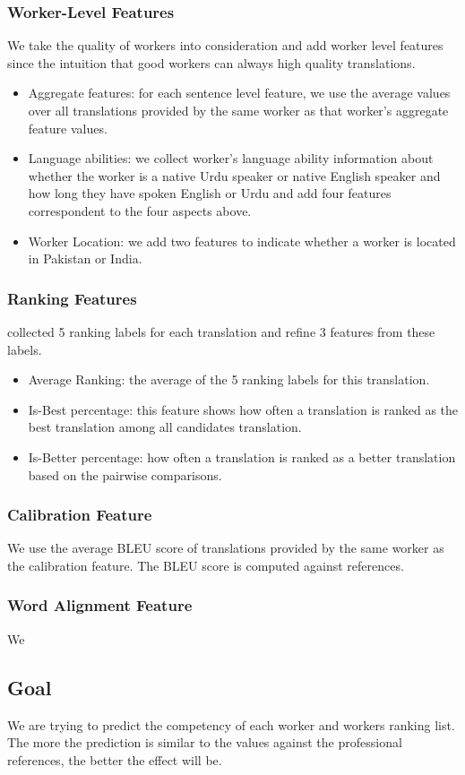 \documentclass[11pt]{article}
\begin{document}
 \subsubsection{Worker-Level Features}
 We take the quality of workers into consideration and add worker level features since the intuition that good workers can always high quality translations.
\begin{itemize}
\item	Aggregate features:	for each sentence level feature, we use the average values over all translations provided by the same worker as that worker's aggregate feature values.
\item	Language abilities:	we collect worker's language ability information about whether the worker is a native Urdu speaker or native English speaker and how long they have spoken English or Urdu and add four features correspondent to the four aspects above.
\item	Worker Location:	we add two features to indicate whether a worker is located in Pakistan or India.
\end{itemize}
 \subsubsection{Ranking Features}
  collected 5 ranking labels for each translation and refine 3 features from these labels.
 \begin{itemize}
 \item Average Ranking:	the average of the 5 ranking labels for this translation.
 \item Is-Best percentage: this feature shows how often a translation is ranked as the best translation among all candidates translation.
 \item Is-Better percentage: how often a translation is ranked as a better translation based on the pairwise comparisons.
 \end{itemize}
 \subsubsection{Calibration Feature}
 We use the average BLEU score of  translations provided by the same worker  as  the calibration feature.
  The BLEU score is computed against references. 
  \subsubsection{Word Alignment Feature}
  We 
 \subsection{Goal}
We are trying to predict the competency of each worker and workers ranking list. The more the prediction is similar to the values against the professional references, the better the effect will be. 
\end{document}
